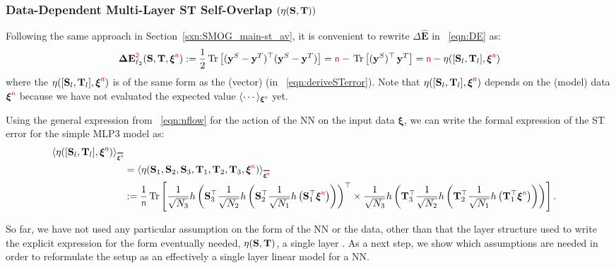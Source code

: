 \subsubsection{Data-Dependent Multi-Layer ST Self-Overlap \texorpdfstring{$(\eta({\mathbf{S}},{\mathbf{T}}))$}{ETA(S, T)}}

Following the same approach in Section~\ref{sxn:SMOG_main-st_av}, it is convenient to rewrite $\Delta \mathbf{\hat{E}}$ in \EQN~\ref{eqn:DE} as:
\begin{align}
\label{eqn:DE2}
\mathbf{\Delta {E}}^{{\color{red}\sf{2}}}_{\ell_2}({\mathbf{S}},{\mathbf{T}}, \boldsymbol{\xi}^{{\color{red}\sf{n}}})
   := \frac{1}{2} \mbox{}\operatorname{Tr}\left[ (\mathbf{y}^{S} - \mathbf{y}^{T})^\top (\mathbf{y}^{S} - \mathbf{y}^{T}) \right]
   = {\color{red}\sf{n}} - \mbox{}\operatorname{Tr}\left[ (\mathbf{y}^{S})^{\top} \, \mathbf{y}^{T}  \right]
   = {\color{red}\sf{n}} - \eta([{\mathbf{S}}_l,{\mathbf{T}}_l],\boldsymbol{\xi}^{{\color{red}\sf{n}}})
\end{align}
where the \SelfOverlap $\eta([{\mathbf{S}}_l,{\mathbf{T}}_l],\boldsymbol{\xi}^{{\color{red}\sf{n}}})$
is of the same form as the (vector) \LinearPerceptron (in \EQN~\ref{eqn:deriveSTerror}).
Note that $\eta([{\mathbf{S}}_l,{\mathbf{T}}_l],\boldsymbol{\xi}^{{\color{red}\sf{n}}})$ depends on the (model) data $\boldsymbol{\xi}^{{\color{red}\sf{n}}}$
because we have not evaluated the expected value $\langle \cdots \rangle_{\boldsymbol{\xi}^{{\color{red}\sf{n}}}}$ yet.

Using the general expression from \EQN~\ref{eqn:nflow} for the action of the NN on the input data $\boldsymbol{\xi}$,
we can write the formal expression of the ST error for the simple MLP3 model as:
\begin{align}
\label{eqn:overlap1}
\ETAMLPAVG  \\ \nonumber
& =\langle\ETA(\SMAT_1,\SMAT_2,\SMAT_3,\TMAT_1,\TMAT_2,\TMAT_3,\NDXI)\rangle_{\AVGNDXI}  \\ \nonumber
& :=  \frac{1}{\ND}\Trace{
    \frac{1}{\sqrt{N_3}} h\left(\SMAT_3^{\top} 
    \frac{1}{\sqrt{N_2}} h\left(\SMAT_2^{\top} 
    \frac{1}{\sqrt{N_1}} h\left(\SMAT_1^{\top} \NDXI \right)\right)\right)^{\top} 
    \times
    \frac{1}{\sqrt{N_3}} h\left(\TMAT_3^{\top} 
    \frac{1}{\sqrt{N_2}} h\left(\TMAT_2^{\top} 
    \frac{1}{\sqrt{N_1}} h\left(\TMAT_1^{\top} \NDXI \right)\right)\right)
  }.
\end{align}

So far, we have not used any particular assumption on the form of the NN or the data, 
other than that the layer structure used to write the explicit expression for the form eventually needed,
$\eta({\mathbf{S}},{\mathbf{T}})$, a single layer \SelfOverlap.
As a next step, we show which assumptions are needed in order to reformulate the setup as
an effectively a single layer linear model for a NN.

